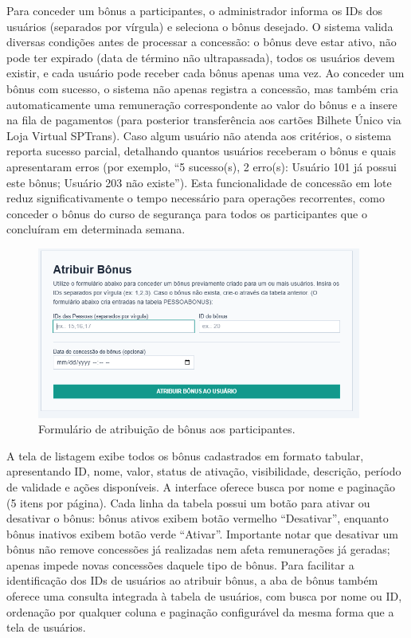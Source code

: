 Para conceder um bônus a participantes, o
administrador informa os IDs dos usuários (separados por vírgula) e seleciona o
bônus desejado. O sistema valida diversas condições antes de processar a
concessão: o bônus deve estar ativo, não pode ter expirado (data de término não
ultrapassada), todos os usuários devem existir, e cada usuário pode receber cada
bônus apenas uma vez. Ao conceder um bônus com sucesso, o sistema não apenas registra a concessão, mas
também cria automaticamente uma remuneração correspondente ao valor do bônus e a
insere na fila de pagamentos (para posterior transferência aos cartões Bilhete
Único via Loja Virtual SPTrans). Caso algum usuário não atenda aos critérios, o
sistema reporta sucesso parcial, detalhando quantos usuários receberam o bônus e
quais apresentaram erros (por exemplo, ``5 sucesso(s), 2 erro(s): Usuário 101 já
possui este bônus; Usuário 203 não existe''). Esta funcionalidade de concessão em
lote reduz significativamente o tempo necessário para operações recorrentes, como
conceder o bônus do curso de segurança para todos os participantes que o
concluíram em determinada semana.

 \begin{figure}[H]
   \centering
   \includegraphics[width=0.95\textwidth]{figuras/atribuir_bonus.PNG}
   \caption{Formulário de atribuição de bônus aos participantes.}
   \label{fig:bonus_atribuir_form}
 \end{figure}

A tela de listagem exibe todos os bônus
cadastrados em formato tabular, apresentando ID, nome, valor, status de ativação,
visibilidade, descrição, período de validade e ações disponíveis. A interface
oferece busca por nome e paginação (5 itens por página). Cada linha da tabela
possui um botão para ativar ou desativar o bônus: bônus ativos exibem
botão vermelho ``Desativar'', enquanto bônus inativos exibem botão verde
``Ativar''. Importante notar que desativar um bônus não remove concessões já
realizadas nem afeta remunerações já geradas; apenas impede novas concessões
daquele tipo de bônus. Para facilitar a identificação dos IDs de usuários ao
atribuir bônus, a aba de bônus também oferece uma consulta integrada à tabela de
usuários, com busca por nome ou ID, ordenação por qualquer coluna e
paginação configurável da mesma forma que a tela de usuários.

